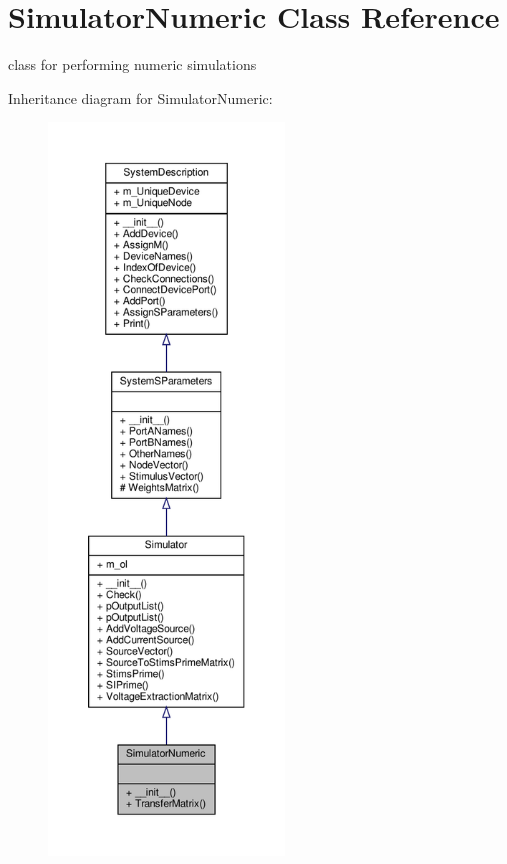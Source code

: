 \hypertarget{classSignalIntegrity_1_1SystemDescriptions_1_1SimulatorNumeric_1_1SimulatorNumeric}{}\section{Simulator\+Numeric Class Reference}
\label{classSignalIntegrity_1_1SystemDescriptions_1_1SimulatorNumeric_1_1SimulatorNumeric}


class for performing numeric simulations  




Inheritance diagram for Simulator\+Numeric\+:\nopagebreak
\begin{figure}[H]
\begin{center}
\leavevmode
\includegraphics[height=550pt]{classSignalIntegrity_1_1SystemDescriptions_1_1SimulatorNumeric_1_1SimulatorNumeric__inherit__graph}
\end{center}
\end{figure}


